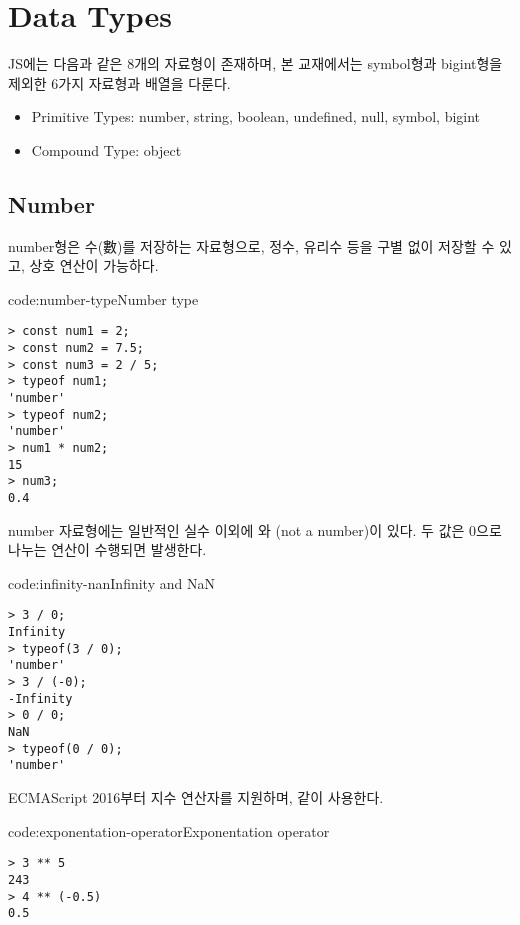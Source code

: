 \section{Data Types}\label{sect:data-types}

JS에는 다음과 같은 8개의 자료형이 존재하며, 본 교재에서는 symbol형과 bigint형을 제외한 6가지 자료형과 배열을 다룬다.

\begin{itemize}
    \item Primitive Types: number, string, boolean, undefined, null, symbol, bigint
    \item Compound Type: object
\end{itemize}

\subsection*{Number}

number형은 수(數)를 저장하는 자료형으로, 정수, 유리수 등을 구별 없이 저장할 수 있고, 상호 연산이 가능하다.

\begin{code}{code:number-type}{Number type}
\begin{verbatim}
> const num1 = 2;
> const num2 = 7.5;
> const num3 = 2 / 5;
> typeof num1;
'number'
> typeof num2;
'number'
> num1 * num2;
15
> num3;
0.4
\end{verbatim}
\end{code}

number 자료형에는 일반적인 실수 이외에 와 (not a number)이 있다. 두 값은 0으로 나누는 연산이 수행되면 발생한다.

\begin{code}{code:infinity-nan}{Infinity and NaN}
\begin{verbatim}
> 3 / 0;
Infinity
> typeof(3 / 0);
'number'
> 3 / (-0);
-Infinity
> 0 / 0;
NaN
> typeof(0 / 0);
'number'
\end{verbatim}
\end{code}
\clearpage

ECMAScript 2016부터 지수 연산자를 지원하며, \와 같이 사용한다.

\begin{code}{code:exponentation-operator}{Exponentation operator}
\begin{verbatim}
> 3 ** 5
243
> 4 ** (-0.5)
0.5
\end{verbatim}
\end{code}

